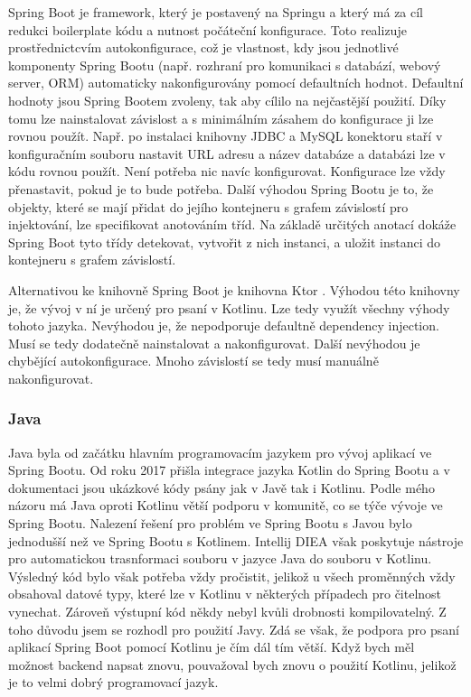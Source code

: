 Spring Boot je framework, který je postavený na Springu a který má za cíl redukci boilerplate kódu a nutnost počáteční konfigurace. Toto realizuje prostřednictcvím autokonfigurace, což je vlastnost, kdy jsou jednotlivé komponenty Spring Bootu (např. rozhraní pro komunikaci s databází, webový server, ORM) automaticky nakonfigurovány pomocí defaultních hodnot. Defaultní hodnoty jsou Spring Bootem zvoleny, tak aby cílilo na nejčastější použití. Díky tomu lze nainstalovat závislost a s minimálním zásahem do konfigurace ji lze rovnou použít. Např. po instalaci knihovny JDBC a MySQL konektoru staří v konfiguračním souboru nastavit URL adresu a název databáze a databázi lze v kódu rovnou použít. Není potřeba nic navíc konfigurovat. Konfigurace lze vždy přenastavit, pokud je to bude potřeba. Další výhodou Spring Bootu je to, že objekty, které se mají přidat do jejího kontejneru s grafem závislostí pro injektování, lze specifikovat anotováním tříd. Na základě určitých anotací dokáže Spring Boot tyto třídy detekovat, vytvořit z nich instanci, a uložit instanci do kontejneru s grafem závislostí.

Alternativou ke knihovně Spring Boot je knihovna Ktor \cite{ktor}. Výhodou této knihovny je, že vývoj v ní je určený pro psaní v Kotlinu. Lze tedy využít všechny výhody tohoto jazyka. Nevýhodou je, že nepodporuje defaultně dependency injection. Musí se tedy dodatečně nainstalovat a nakonfigurovat. Další nevýhodou je chybějící autokonfigurace. Mnoho závislostí se tedy musí manuálně nakonfigurovat.

\subsubsection*{Java}
Java byla od začátku hlavním programovacím jazykem pro vývoj aplikací ve Spring Bootu. Od roku 2017 přišla integrace jazyka Kotlin do Spring Bootu \cite{kotlin-support} a v dokumentaci jsou ukázkové kódy psány jak v Javě tak i Kotlinu. Podle mého názoru má Java oproti Kotlinu větší podporu v komunitě, co se týče vývoje ve Spring Bootu. Nalezení řešení pro problém ve Spring Bootu s Javou bylo jednodušší než ve Spring Bootu s Kotlinem. Intellij DIEA však poskytuje nástroje pro automatickou trasnformaci souboru v jazyce Java do souboru v Kotlinu. Výsledný kód bylo však potřeba vždy pročistit, jelikož u všech proměnných vždy obsahoval datové typy, které lze v Kotlinu v některých případech pro čitelnost vynechat. Zároveň výstupní kód někdy nebyl kvůli drobnosti kompilovatelný. Z toho důvodu jsem se rozhodl pro použití Javy. Zdá se však, že podpora pro psaní aplikací Spring Boot pomocí Kotlinu je čím dál tím větší. Když bych měl možnost backend napsat znovu, pouvažoval bych znovu o použití Kotlinu, jelikož je to velmi dobrý programovací jazyk.

